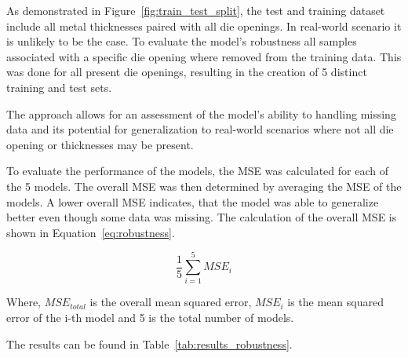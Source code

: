 As demonstrated in Figure~\ref{fig:train_test_split}, the test and training dataset include all
metal thicknesses paired with all die openings.
In real-world scenario it is unlikely to be the case.
To evaluate the model's robustness all samples associated with a specific die opening
where removed from the training data.
This was done for all present die openings, resulting in the creation of 5 distinct training and
test sets.

The approach allows for an assessment of the model's ability to handling missing data and its
potential for generalization to real-world scenarios where not all die opening or thicknesses
may be present.

To evaluate the performance of the models, the \ac{MSE} was calculated for each of the 5 models.
The overall MSE was then determined by averaging the \ac{MSE} of the models.
A lower overall MSE indicates, that the model was able to generalize better even though some
data was missing. The calculation of the overall MSE is shown in Equation~\ref{eq:robustness}.

\begin{tcolorbox}[arc=0pt,boxrule=0.5pt]
    \begin{equation}
        \frac{1}{5}\sum_{i=1}^{5} MSE_i
        \label{eq:robustness}
    \end{equation}
\end{tcolorbox}

Where, $MSE_{total}$ is the overall mean squared error, $MSE_i$ is the mean squared error of the
i-th model and 5 is the total number of models.

The results can be found in Table~\ref{tab:results_robustness}.

%


